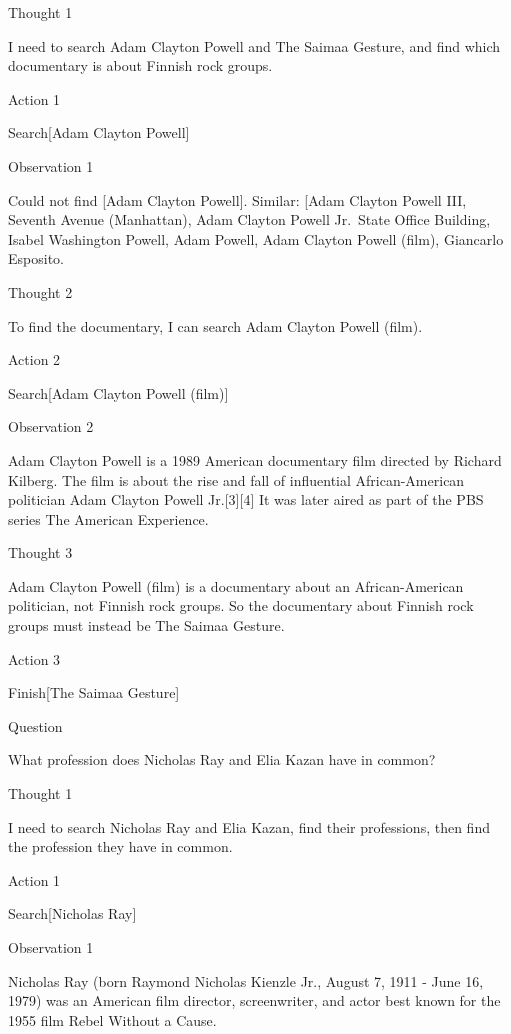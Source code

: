 \documentclass[
]{article}
\begin{document}
Thought 1

I need to search Adam Clayton Powell and The Saimaa Gesture, and find
which documentary is about Finnish rock groups.

Action 1

Search{[}Adam Clayton Powell{]}

Observation 1

Could not find {[}Adam Clayton Powell{]}. Similar:
{[}\textquotesingle Adam Clayton Powell III\textquotesingle,
\textquotesingle Seventh Avenue (Manhattan)\textquotesingle,
\textquotesingle Adam Clayton Powell Jr.~State Office
Building\textquotesingle, \textquotesingle Isabel Washington
Powell\textquotesingle, \textquotesingle Adam Powell\textquotesingle,
\textquotesingle Adam Clayton Powell (film)\textquotesingle,
\textquotesingle Giancarlo Esposito\textquotesingle{]}.

Thought 2

To find the documentary, I can search Adam Clayton Powell (film).

Action 2

Search{[}Adam Clayton Powell (film){]}

Observation 2

Adam Clayton Powell is a 1989 American documentary film directed by
Richard Kilberg. The film is about the rise and fall of influential
African-American politician Adam Clayton Powell Jr.{[}3{]}{[}4{]} It was
later aired as part of the PBS series The American Experience.

Thought 3

Adam Clayton Powell (film) is a documentary about an African-American
politician, not Finnish rock groups. So the documentary about Finnish
rock groups must instead be The Saimaa Gesture.

Action 3

Finish{[}The Saimaa Gesture{]}

Question

What profession does Nicholas Ray and Elia Kazan have in common?

Thought 1

I need to search Nicholas Ray and Elia Kazan, find their professions,
then find the profession they have in common.

Action 1

Search{[}Nicholas Ray{]}

Observation 1

Nicholas Ray (born Raymond Nicholas Kienzle Jr., August 7, 1911 - June
16, 1979) was an American film director, screenwriter, and actor best
known for the 1955 film Rebel Without a Cause.
\end{document}
